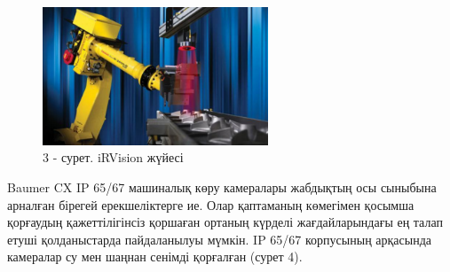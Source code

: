 \begin{figure}[H]
	\centering
	\includegraphics[width=0.6\textwidth]{media/ict2/image170}
	\caption*{3 - сурет. iRVision жүйесі}
\end{figure}

\begin{multicols}{2}
Baumer CX IP 65/67 машиналық көру камералары жабдықтың осы сыныбына
арналған бірегей ерекшеліктерге ие. Олар қаптаманың көмегімен қосымша
қорғаудың қажеттілігінсіз қоршаған ортаның күрделі жағдайларындағы ең
талап етуші қолданыстарда пайдаланылуы мүмкін. IP 65/67 корпусының
арқасында камералар су мен шаңнан сенімді қорғалған (сурет 4).
\end{multicols}

